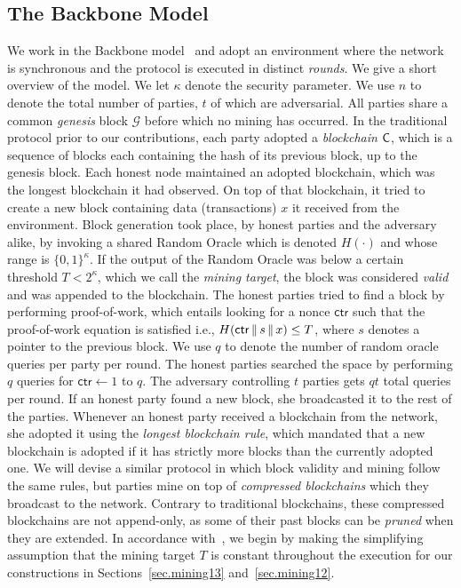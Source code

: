 \subsection{The Backbone Model}
We work in the Backbone model~\cite{backbone} and adopt an
environment where the network is synchronous and the protocol is executed in
distinct \emph{rounds}. We give a short overview of the model. We let $\kappa$
denote the security parameter. We use $n$ to denote the total number of parties,
$t$ of which are adversarial. All parties share a common \emph{genesis} block
$\mathcal{G}$ before which no mining has occurred. In the traditional protocol
prior to our contributions, each party adopted a
\emph{blockchain} $\mathsf{C}$, which is a sequence of blocks each containing the
hash of its previous block, up to the genesis block. Each honest node maintained
an adopted blockchain, which was the longest blockchain it had observed. On top
of that blockchain, it tried to create a new block containing data
(transactions) $x$ it received from the environment. Block generation took
place, by honest parties and the adversary alike, by invoking a shared Random
Oracle which is denoted $H(\cdot)$ and whose range is $\{0,1\}^\kappa$. If the
output of the Random Oracle was below a certain threshold $T < 2^\kappa$, which
we call the \emph{mining target}, the block was considered \emph{valid} and was
appended to the blockchain. The honest parties tried to find a block by performing
proof-of-work, which entails looking for a nonce $\mathsf{ctr}$ such that the
proof-of-work equation is satisfied i.e., $H(\mathsf{ctr} \,\|\, s \,\|\, x) \leq T$,
where $s$ denotes a pointer to the previous block. We use $q$ to denote the
number of random oracle queries per party per round. The honest parties searched
the space by performing $q$ queries for $\mathsf{ctr} \gets 1$ to $q$. The
adversary controlling $t$ parties gets $qt$ total queries per round. If an
honest party found a new block, she broadcasted it to the rest of the parties.
Whenever an honest party received a blockchain from the network, she adopted it
using the \emph{longest blockchain rule}, which mandated that a new blockchain
is adopted if it has strictly more blocks than the currently adopted one.
We will devise a similar protocol in which block validity and mining follow the
same rules, but parties mine on top of \emph{compressed blockchains} which they
broadcast to the network. Contrary to traditional blockchains, these compressed
blockchains are not append-only, as some of their past blocks can be
\emph{pruned} when they are extended.
In accordance with~\cite{backbone},
we begin by making the simplifying assumption that the mining target $T$ is
constant throughout the execution for our constructions in
Sections~\ref{sec.mining13} and~\ref{sec.mining12}.

